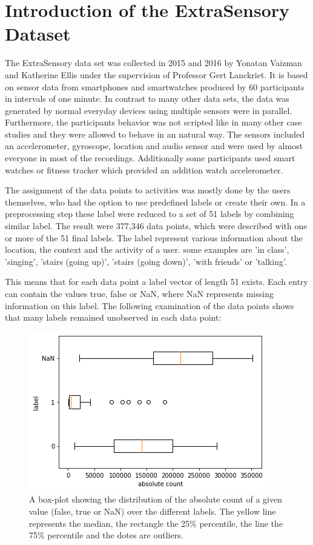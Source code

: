 \section{Introduction of the ExtraSensory Dataset}

The ExtraSensory data set was collected in 2015 and 2016 by Yonatan Vaizman and Katherine Ellis under the supervision of Professor Gert Lanckriet. It is based on sensor data from smartphones and smartwatches produced by 60 participants in intervals of one minute. In contrast to many other data sets, the data was generated by normal everyday devices using multiple sensors were in parallel. Furthermore, the participants behavior was not scripted like in many other case studies and they were allowed to behave in an natural way. The sensors included an accelerometer, gyroscope, location and audio sensor and were used by almost everyone in most of the recordings. Additionally some participants used smart watches or fitness tracker which provided an addition watch accelerometer.

The assignment of the data points to activities was mostly done by the users themselves, who had the option to use predefined labels or create their own. In a preprocessing step these label were reduced to a set of 51 labels by combining similar label. The result were 377,346 data points, which were described with one or more of the 51 final labels. The label represent various information about the location, the context and the activity of a user. some examples are 'in class', 'singing', 'stairs (going up)', 'stairs (going down)', 'with friends' or 'talking'.

This means that for each data point a label vector of length 51 exists. Each entry can contain the values true, false or NaN, where NaN represents missing information on this label. The following examination of the data points shows that many labels remained unobserved in each data point:

\begin{figure}[H]
	\begin{center}
		\includegraphics[scale=.8]{images/boxplot_label.png}
		\caption{A box-plot showing the distribution of the absolute count of a given value (false, true or NaN) over the different labels. The yellow line represents the median, the rectangle the 25\% percentile, the line the 75\% percentile and the dotes are outliers.}
		\label{abb:boxplot_label}
	\end{center}		
\end{figure}	


